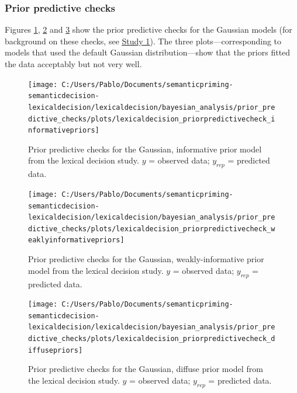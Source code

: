 \documentclass[
  12pt,
  man,floatsintext]{apa7}
\begin{document}
\hypertarget{prior-predictive-checks-2}{%
\subsubsection{Prior predictive checks}\label{prior-predictive-checks-2}}

Figures \ref{fig:lexicaldecision-priorpredictivecheck-informativepriors}, \ref{fig:lexicaldecision-priorpredictivecheck-weaklyinformativepriors} and \ref{fig:lexicaldecision-priorpredictivecheck-diffusepriors} show the prior predictive checks for the Gaussian models (for background on these checks, see \protect\hyperlink{study1-bayesian-diagnostics}{\underline{Study 1}}). The three plots---corresponding to models that used the default Gaussian distribution---show that the priors fitted the data acceptably but not very well.



\begin{figure}

{\centering \texttt{[image: C:/Users/Pablo/Documents/semanticpriming-semanticdecision-lexicaldecision/lexicaldecision/bayesian\_analysis/prior\_predictive\_checks/plots/lexicaldecision\_priorpredictivecheck\_informativepriors]} 

}

\caption{Prior predictive checks for the Gaussian, informative prior model from the lexical decision study. \(y\) = observed data; \(y_{rep}\) = predicted data.}\label{fig:lexicaldecision-priorpredictivecheck-informativepriors}
\end{figure}



\begin{figure}

{\centering \texttt{[image: C:/Users/Pablo/Documents/semanticpriming-semanticdecision-lexicaldecision/lexicaldecision/bayesian\_analysis/prior\_predictive\_checks/plots/lexicaldecision\_priorpredictivecheck\_weaklyinformativepriors]} 

}

\caption{Prior predictive checks for the Gaussian, weakly-informative prior model from the lexical decision study. \(y\) = observed data; \(y_{rep}\) = predicted data.}\label{fig:lexicaldecision-priorpredictivecheck-weaklyinformativepriors}
\end{figure}



\begin{figure}

{\centering \texttt{[image: C:/Users/Pablo/Documents/semanticpriming-semanticdecision-lexicaldecision/lexicaldecision/bayesian\_analysis/prior\_predictive\_checks/plots/lexicaldecision\_priorpredictivecheck\_diffusepriors]} 

}

\caption{Prior predictive checks for the Gaussian, diffuse prior model from the lexical decision study. \(y\) = observed data; \(y_{rep}\) = predicted data.}\label{fig:lexicaldecision-priorpredictivecheck-diffusepriors}
\end{figure}
\end{document}
